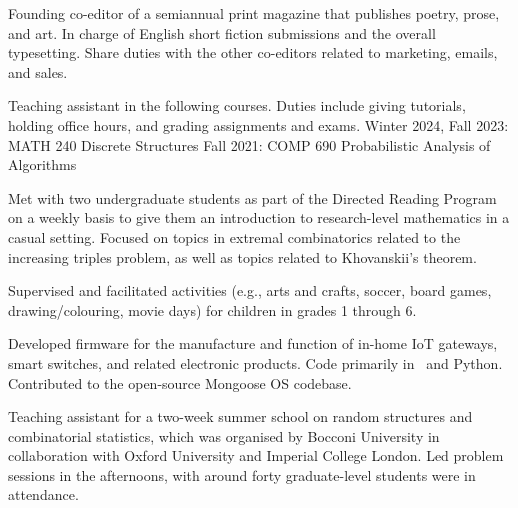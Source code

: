 
\smallskip
Founding co-editor of a semiannual print magazine that publishes poetry, prose, and art.
In charge of English short fiction submissions and the overall typesetting. Share duties with the other
co-editors related to marketing, emails, and sales.
\medbreak

\smallskip
Teaching assistant in the following courses. Duties include giving tutorials, holding office hours, and
grading assignments and exams.
\begingroup\parindent=10pt
\smallskip
\thing Winter 2024, Fall 2023: MATH 240 Discrete Structures
\smallskip
\thing Fall 2021: COMP 690 Probabilistic Analysis of Algorithms
\endgroup
\medbreak

\smallskip
Met with two undergraduate students as part of the Directed Reading Program
on a weekly basis to give them an introduction to research-level
mathematics in a casual setting. Focused on topics in extremal combinatorics related to the increasing
triples problem, as well as topics related to Khovanskii's theorem.
\medbreak


\smallskip
Supervised and facilitated activities (e.g., arts and crafts, soccer, board games, drawing/colouring, movie
days) for children in grades 1 through 6.
\medbreak

\smallskip
Developed firmware for the manufacture and function of in-home IoT gateways, smart switches,
and related electronic products. Code primarily in \CEE\ and Python. Contributed to the open-source
Mongoose OS codebase.
\medbreak

\smallskip
Teaching assistant for a two-week summer school on random structures and combinatorial statistics,
which was
organised by Bocconi University in collaboration with Oxford University
and Imperial College London. Led problem sessions in the afternoons, with
around forty graduate-level students were in attendance.
\medbreak


